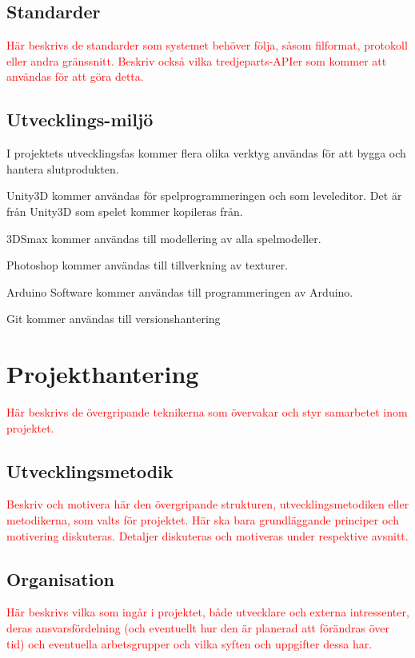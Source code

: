 \documentclass[a4paper,12pt,oneside,final]{extbook}
\begin{document}
\section{Standarder}



\textcolor{red}{Här beskrivs de standarder som systemet behöver följa, såsom filformat, protokoll eller andra gränssnitt.
Beskriv också vilka tredjeparts-APIer som kommer att användas för att göra detta.}

\section{Utvecklings-miljö}

I projektets utvecklingsfas kommer flera olika verktyg användas för att bygga och hantera slutprodukten.

Unity3D kommer användas för spelprogrammeringen och som leveleditor. Det är från Unity3D som spelet kommer kopileras från.

3DSmax kommer användas till modellering av alla spelmodeller.

Photoshop kommer användas till tillverkning av texturer.

Arduino Software kommer användas till programmeringen av Arduino.

Git kommer användas till versionshantering


\chapter{Projekthantering}

\textcolor{red}{Här beskrivs de övergripande teknikerna som övervakar och styr samarbetet inom projektet.}

\section{Utvecklingsmetodik}

\textcolor{red}{Beskriv och motivera här den övergripande strukturen, utvecklingsmetodiken eller metodikerna, som
	valts för projektet. Här ska bara grundläggande principer och motivering diskuteras. Detaljer diskuteras
	och motiveras under respektive avsnitt.
}

\section{Organisation}

\textcolor{red}{Här beskrivs vilka som ingår i projektet, både utvecklare och externa intressenter, deras ansvarsfördelning
	(och eventuellt hur den är planerad att förändras över tid) och eventuella arbetsgrupper och
	vilka syften och uppgifter dessa har.}
\end{document}
